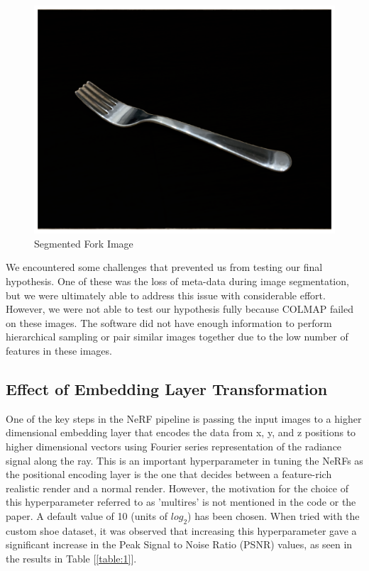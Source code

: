\documentclass[conference]{IEEEtran}
\begin{document}
\begin{figure} [h]
\centering
  \includegraphics[scale = 0.07]{figures/results/fork-segment.png}  
  \caption{\label{fig:fork_seg} Segmented Fork Image}
\end{figure}

We encountered some challenges that prevented us from testing our final hypothesis. One of these was the loss of meta-data during image segmentation, but we were ultimately able to address this issue with considerable effort. However, we were not able to test our hypothesis fully because COLMAP failed on these images. The software did not have enough information to perform hierarchical sampling or pair similar images together due to the low number of features in these images.


\subsection{Effect of Embedding Layer Transformation} \label{hyper-parameter-section}
One of the key steps in the NeRF pipeline is passing the input images to a higher dimensional embedding layer that encodes the data from x, y, and z positions to higher dimensional vectors using Fourier series representation of the radiance signal along the ray. This is an important hyperparameter in tuning the NeRFs as the positional encoding layer is the one that decides between a feature-rich realistic render and a normal render. However, the motivation for the choice of this hyperparameter referred to as 'multires' is not mentioned in the code or the paper. A default value of 10 (units of $log_2$) has been chosen. When tried with the custom shoe dataset, it was observed that increasing this hyperparameter gave a significant increase in the Peak Signal to Noise Ratio (PSNR) values, as seen in the results in Table [\ref{table:1}].
\end{document}
